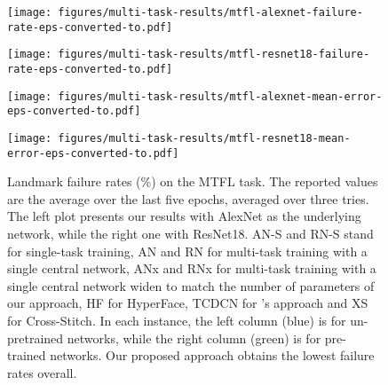 \documentclass[runningheads]{llncs}
\newcommand{\citet}{\cite}
\begin{document}
\begin{figure}[t]
    \centering
    \begin{minipage}{0.49\linewidth}
        \texttt{[image: figures/multi-task-results/mtfl-alexnet-failure-rate-eps-converted-to.pdf]}
    \end{minipage}
    \begin{minipage}{0.49\linewidth}
        \texttt{[image: figures/multi-task-results/mtfl-resnet18-failure-rate-eps-converted-to.pdf]}
    \end{minipage}
    \begin{minipage}{0.49\linewidth}
    \texttt{[image: figures/multi-task-results/mtfl-alexnet-mean-error-eps-converted-to.pdf]}
    \end{minipage}
    \begin{minipage}{0.49\linewidth}
        \texttt{[image: figures/multi-task-results/mtfl-resnet18-mean-error-eps-converted-to.pdf]}
    \end{minipage}
    \caption{Landmark failure rates (\%) on the MTFL task. The reported values are the average over the last five epochs, averaged over three tries. The left plot presents our results with AlexNet as the underlying network, while the right one with ResNet18. AN-S and RN-S stand for single-task training, AN and RN for multi-task training with a single central network, ANx and RNx for multi-task training with a single central network widen to match the number of parameters of our approach, HF for HyperFace, TCDCN for \citet{zhang2014facial}'s approach and XS for Cross-Stitch. In each instance, the left column (blue) is for un-pretrained networks, while the right column (green) is for pre-trained networks. Our proposed approach obtains the lowest failure rates overall.}
    \label{fig:results-mtfl}
\end{figure}
\end{document}
